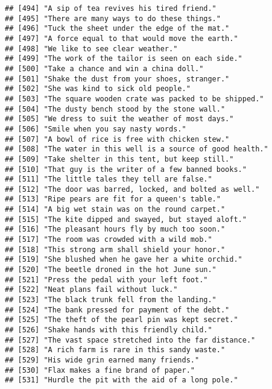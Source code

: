 \documentclass[
]{article}
\begin{document}
\begin{verbatim}
## [494] "A sip of tea revives his tired friend."                   
## [495] "There are many ways to do these things."                  
## [496] "Tuck the sheet under the edge of the mat."                
## [497] "A force equal to that would move the earth."              
## [498] "We like to see clear weather."                            
## [499] "The work of the tailor is seen on each side."             
## [500] "Take a chance and win a china doll."                      
## [501] "Shake the dust from your shoes, stranger."                
## [502] "She was kind to sick old people."                         
## [503] "The square wooden crate was packed to be shipped."        
## [504] "The dusty bench stood by the stone wall."                 
## [505] "We dress to suit the weather of most days."               
## [506] "Smile when you say nasty words."                          
## [507] "A bowl of rice is free with chicken stew."                
## [508] "The water in this well is a source of good health."       
## [509] "Take shelter in this tent, but keep still."               
## [510] "That guy is the writer of a few banned books."            
## [511] "The little tales they tell are false."                    
## [512] "The door was barred, locked, and bolted as well."         
## [513] "Ripe pears are fit for a queen's table."                  
## [514] "A big wet stain was on the round carpet."                 
## [515] "The kite dipped and swayed, but stayed aloft."            
## [516] "The pleasant hours fly by much too soon."                 
## [517] "The room was crowded with a wild mob."                    
## [518] "This strong arm shall shield your honor."                 
## [519] "She blushed when he gave her a white orchid."             
## [520] "The beetle droned in the hot June sun."                   
## [521] "Press the pedal with your left foot."                     
## [522] "Neat plans fail without luck."                            
## [523] "The black trunk fell from the landing."                   
## [524] "The bank pressed for payment of the debt."                
## [525] "The theft of the pearl pin was kept secret."              
## [526] "Shake hands with this friendly child."                    
## [527] "The vast space stretched into the far distance."          
## [528] "A rich farm is rare in this sandy waste."                 
## [529] "His wide grin earned many friends."                       
## [530] "Flax makes a fine brand of paper."                        
## [531] "Hurdle the pit with the aid of a long pole."              

\end{verbatim}
\end{document}
